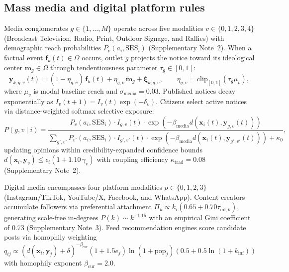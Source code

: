 \documentclass[11pt,a4paper]{article}
\begin{document}
\subsection*{Mass media and digital platform rules}
Media conglomerates $g \in \{1, \dots, M\}$ operate across five modalities $v \in \{0, 1, 2, 3, 4\}$ (Broadcast Television, Radio, Print, Outdoor Signage, and Rallies) with demographic reach probabilities $P_v(a_i, \mathrm{SES}_i)$ (Supplementary Note~2). When a factual event $\mathbf{f}_k(t) \in \Omega$ occurs, outlet $g$ projects the notice toward its ideological center $\mathbf{m}_g \in \Omega$ through tendentiousness parameter $\tau_g \in [0, 1]$:
\begin{equation}
    \mathbf{y}_{k,g,v}(t) = (1 - \eta_{g,v})\,\mathbf{f}_k(t) + \eta_{g,v}\,\mathbf{m}_g + \boldsymbol{\xi}_{k,g,v}, \qquad \eta_{g,v} = \mathrm{clip}_{[0, 1]}(\tau_g \mu_v),
    \label{eq:methods_media_projection}
\end{equation}
where $\mu_v$ is modal baseline reach and $\sigma_{\mathrm{media}} = 0.03$. Published notices decay exponentially as $I_v(t+1) = I_v(t)\exp(-\delta_v)$. Citizens select active notices via distance-weighted softmax selective exposure:
\begin{equation}
    P(g, v \mid i) = \frac{P_v(a_i, \mathrm{SES}_i) \cdot I_{g,v}(t) \cdot \exp\!\left(-\beta_{\mathrm{media}} d(\mathbf{x}_i(t), \mathbf{y}_{g,v}(t))\right)}{\sum_{g',v'} P_{v'}(a_i, \mathrm{SES}_i) \cdot I_{g',v'}(t) \cdot \exp\!\left(-\beta_{\mathrm{media}} d(\mathbf{x}_i(t), \mathbf{y}_{g',v'}(t))\right) + \kappa_0},
    \label{eq:methods_selective_exposure}
\end{equation}
updating opinions within credibility-expanded confidence bounds $d(\mathbf{x}_i, \mathbf{y}_v) \le \epsilon_i (1 + 1.10\,\gamma_v)$ with coupling efficiency $\kappa_{\mathrm{trad}} = 0.08$ (Supplementary Note~2).

Digital media encompasses four platform modalities $p \in \{0, 1, 2, 3\}$ (Instagram/TikTok, YouTube/X, Facebook, and WhatsApp). Content creators accumulate followers via preferential attachment $\Pi_k \propto k_i (0.65 + 0.70\tau_{\mathrm{inf}, k})$, generating scale-free in-degrees $P(k) \sim k^{-1.15}$ with an empirical Gini coefficient of $0.73$ (Supplementary Note~3). Feed recommendation engines score candidate posts via homophily weighting $q_{ij} \propto (d(\mathbf{x}_i, \mathbf{y}_j) + \delta)^{-\beta_{\mathrm{cur}}}(1 + 1.5 e_j)\ln(1 + \mathrm{pop}_j)(0.5 + 0.5\ln(1 + k_{\mathrm{inf}}))$ with homophily exponent $\beta_{\mathrm{cur}} = 2.0$.
\end{document}
